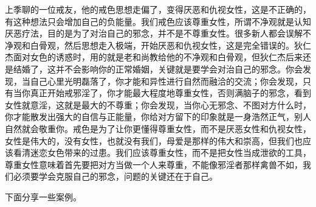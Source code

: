 上季聊的一位戒友，他的戒色思想走偏了，变得厌恶和仇视女性，这是不正确的，有这种想法只会增加自己的负能量。我们戒色应该尊重女性，所谓不净观就是认知厌恶疗法，目的是为了对治自己的邪念，并不是不尊重女性。很多新人都会误解不净观和白骨观，然后思想走入极端，开始厌恶和仇视女性，这是完全错误的。狄仁杰面对女色的诱惑时，用的就是老和尚教给他的不净观和白骨观，但狄仁杰后来还是结婚了，这并不会影响你的正常婚姻，关键就是要学会对治自己的邪念。你会发现，当自己心里光明磊落了，你才能和异性进行自然而融洽的交流；你会发现，只有当你真正开始戒邪淫了，你才能最大程度地尊重女性，否则满脑子的邪念，看到女性就意淫，这就是最大的不尊重；你会发现，当你心无邪念、不图对方什么时，你才能散发出强大的自信与正能量，你给对方留下的印象就是一身浩然正气，别人自然就会敬重你。戒色是为了让你更懂得尊重女性，而不是厌恶女性和仇视女性，女性是伟大的，没有女性，也就没有我们，母爱是那样的伟大和崇高，但我们也应该看清迷恋女色带来的过患。我们应该尊重女性，而不是把女性当成泄欲的工具，尊重女性意味着首先要把对方当做一个人来尊重，不能像邪淫者那样禽兽不如，我们必须要学会克服自己的邪念，问题的关键还在于自己。

下面分享一些案例。


